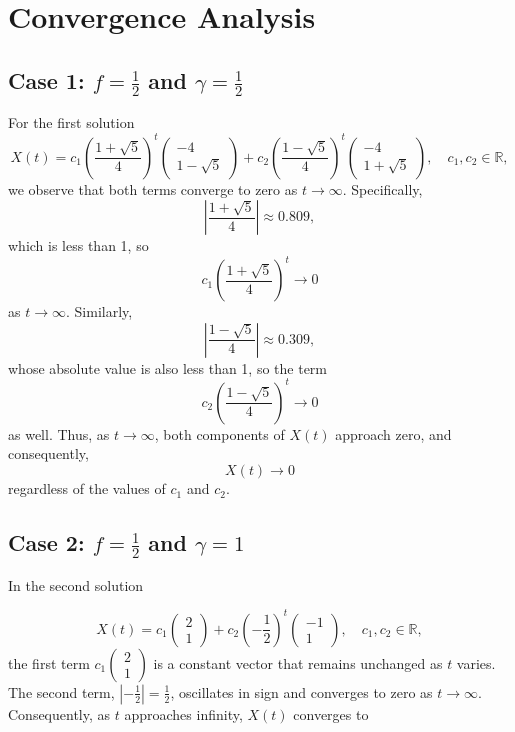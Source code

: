 \documentclass [a4paper]{article}
\begin{document}
\section{Convergence Analysis}

\subsection*{Case 1: \( f = \frac{1}{2} \) and \( \gamma = \frac{1}{2} \)}

For the first solution 
\[
X(t) = c_1{\left(\frac{1 + \sqrt{5}}{4}\right)}^t\begin{pmatrix} -4 \\ 1-\sqrt{5} \end{pmatrix} + c_2{\left(\frac{1 - \sqrt{5}}{4}\right)}^t\begin{pmatrix} -4 \\ 1 +\sqrt{5} \end{pmatrix}, \quad c_1, c_2 \in \mathbb{R},
\]
we observe that both terms converge to zero as \( t \to \infty \). Specifically, 
\[
\left| \frac{1 + \sqrt{5}}{4} \right| \approx 0.809,
\]
which is less than 1, so 
\[
c_1{\left(\frac{1 + \sqrt{5}}{4}\right)}^t \to 0
\]
as \( t \to \infty \). 
Similarly, 
\[
\left| \frac{1 - \sqrt{5}}{4} \right| \approx 0.309,
\]
whose absolute value is also less than 1, so the term 
\[
c_2{\left(\frac{1 - \sqrt{5}}{4}\right)}^t \to 0
\]
as well. 
Thus, as \(t \to \infty\), both components of \(X(t)\) approach zero, and consequently, 
\[
X(t) \to 0
\]
regardless of the values of \(c_1\) and \(c_2\).

\subsection*{Case 2: \( f = \frac{1}{2} \) and \( \gamma = 1 \)}

In the second solution 

\[
X(t) = c_1\begin{pmatrix} 2 \\ 1 \end{pmatrix} + c_2{\left(-\frac{1}{2}\right)}^t\begin{pmatrix} -1\\ 1 \end{pmatrix}, \quad c_1, c_2 \in \mathbb{R},
\]
the first term \(c_1\begin{pmatrix} 2 \\ 1 \end{pmatrix}\) is a constant vector that remains unchanged as \(t\) varies. The second term, \(\left| -\frac{1}{2} \right| = \frac{1}{2}\), oscillates in sign and converges to zero as \(t \to \infty\). Consequently, as \(t\) approaches infinity, \(X(t)\) converges to 
\end{document}
